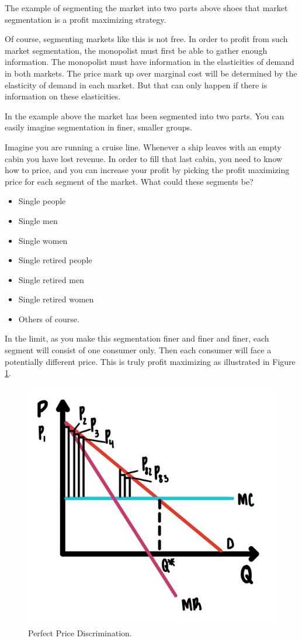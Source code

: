 \documentclass[
]{book}
\providecommand{\tightlist}{%
  \setlength{\itemsep}{0pt}\setlength{\parskip}{0pt}}
\begin{document}
The example of segmenting the market into two parts above shoes that market segmentation is a profit maximizing strategy.

Of course, segmenting markets like this is not free. In order to profit from such market segmentation, the monopolist must first be able to gather enough information. The monopolist must have information in the elasticities of demand in both markets. The price mark up over marginal cost will be determined by the elasticity of demand in each market. But that can only happen if there is information on these elasticities.

In the example above the market has been segmented into two parts. You can easily imagine segmentation in finer, smaller groups.

Imagine you are running a cruise line. Whenever a ship leaves with an empty cabin you have lost revenue. In order to fill that last cabin, you need to know how to price, and you can increase your profit by picking the profit maximizing price for each segment of the market. What could these segments be?

\begin{itemize}
\tightlist
\item
  Single people
\item
  Single men
\item
  Single women
\item
  Single retired people
\item
  Single retired men
\item
  Single retired women
\item
  Others of course.
\end{itemize}

In the limit, as you make this segmentation finer and finer and finer, each segment will consist of one consumer only. Then each consumer will face a potentially different price. This is truly profit maximizing as illustrated in Figure \ref{fig:monopoly08}.

\begin{figure}

{\centering \includegraphics[width=0.5\linewidth]{img/monopoly/fig8} 

}

\caption{Perfect Price Discrimination.}\label{fig:monopoly08}
\end{figure}
\end{document}
